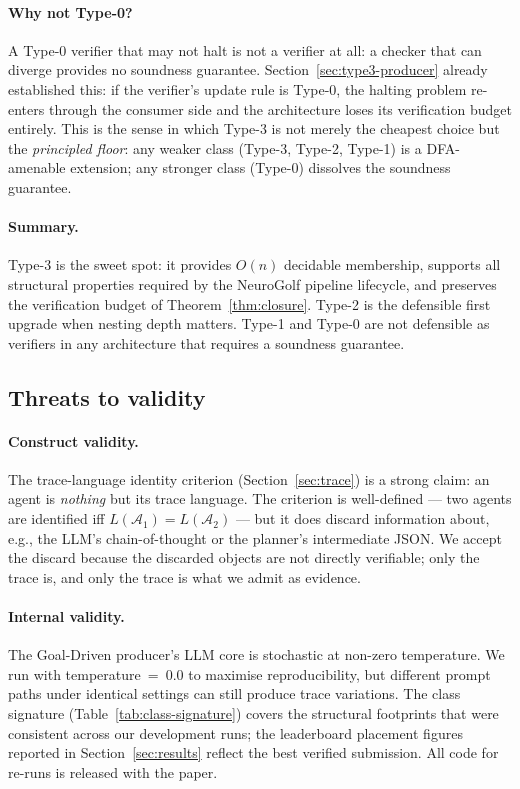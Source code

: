 \paragraph{Why not Type-0?}
A Type-0 verifier that may not halt is not a verifier at all:
a checker that can diverge provides no soundness guarantee.
Section~\ref{sec:type3-producer} already established this: if the
verifier's update rule is Type-0, the halting problem re-enters
through the consumer side and the architecture loses its
verification budget entirely.  This is the sense in which Type-3
is not merely the cheapest choice but the \emph{principled floor}:
any weaker class (Type-3, Type-2, Type-1) is a DFA-amenable
extension; any stronger class (Type-0) dissolves the soundness
guarantee.

\paragraph{Summary.}
Type-3 is the sweet spot: it provides $O(n)$ decidable membership,
supports all structural properties required by the NeuroGolf
pipeline lifecycle, and preserves the verification budget of
Theorem~\ref{thm:closure}.  Type-2 is the defensible first
upgrade when nesting depth matters.  Type-1 and Type-0 are not
defensible as verifiers in any architecture that requires a
soundness guarantee.

\subsection{Threats to validity}

\paragraph{Construct validity.}
The trace-language identity criterion (Section~\ref{sec:trace})
is a strong claim: an agent is \emph{nothing} but its trace
language.  The criterion is well-defined --- two agents are
identified iff $L(\mathcal{A}_1) = L(\mathcal{A}_2)$ --- but it
does discard information about, e.g., the LLM's chain-of-thought
or the planner's intermediate JSON.  We accept the discard
because the discarded objects are not directly verifiable; only
the trace is, and only the trace is what we admit as evidence.

\paragraph{Internal validity.}
The Goal-Driven producer's LLM core is stochastic at non-zero
temperature.  We run with temperature~=~0.0 to maximise
reproducibility, but different prompt paths under identical settings
can still produce trace variations.  The class signature
(Table~\ref{tab:class-signature}) covers the structural footprints
that were consistent across our development runs; the leaderboard
placement figures reported in Section~\ref{sec:results} reflect
the best verified submission.  All code for re-runs is released
with the paper.

